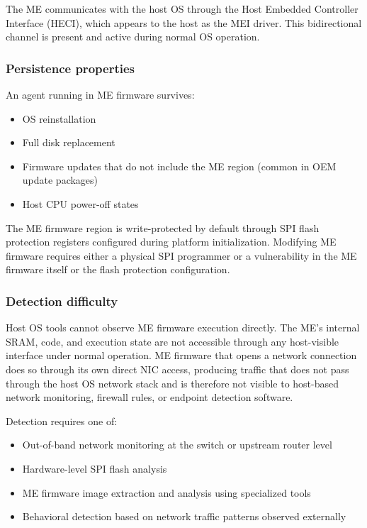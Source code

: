 \documentclass[11pt,a4paper]{article}
\begin{document}
The ME communicates with the host OS through the Host Embedded Controller Interface (HECI), which appears to the host as the MEI driver. This bidirectional channel is present and active during normal OS operation.

\subsubsection{Persistence properties}

An agent running in ME firmware survives:

\begin{itemize}[noitemsep]
\item OS reinstallation
\item Full disk replacement
\item Firmware updates that do not include the ME region (common in OEM update packages)
\item Host CPU power-off states
\end{itemize}

The ME firmware region is write-protected by default through SPI flash protection registers configured during platform initialization. Modifying ME firmware requires either a physical SPI programmer or a vulnerability in the ME firmware itself or the flash protection configuration.

\subsubsection{Detection difficulty}

Host OS tools cannot observe ME firmware execution directly. The ME's internal SRAM, code, and execution state are not accessible through any host-visible interface under normal operation. ME firmware that opens a network connection does so through its own direct NIC access, producing traffic that does not pass through the host OS network stack and is therefore not visible to host-based network monitoring, firewall rules, or endpoint detection software.

Detection requires one of:

\begin{itemize}[noitemsep]
\item Out-of-band network monitoring at the switch or upstream router level
\item Hardware-level SPI flash analysis
\item ME firmware image extraction and analysis using specialized tools
\item Behavioral detection based on network traffic patterns observed externally
\end{itemize}
\end{document}
